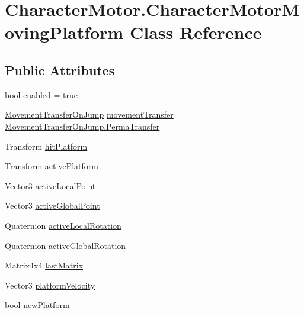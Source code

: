 \hypertarget{class_character_motor_1_1_character_motor_moving_platform}{}\section{Character\+Motor.\+Character\+Motor\+Moving\+Platform Class Reference}
\label{class_character_motor_1_1_character_motor_moving_platform}
\subsection*{Public Attributes}
\begin{DoxyCompactItemize}
\item 
bool \hyperlink{class_character_motor_1_1_character_motor_moving_platform_abd532a0a431c10e58955de10e0ed8918}{enabled} = true
\item 
\hyperlink{class_character_motor_ae8904b1ae7907502123f9376cf77a045}{Movement\+Transfer\+On\+Jump} \hyperlink{class_character_motor_1_1_character_motor_moving_platform_a39e0b3b19798b14d3a765c3e91fe630e}{movement\+Transfer} = \hyperlink{class_character_motor_ae8904b1ae7907502123f9376cf77a045a1caa5cdb42cd1fe12e5047b8aaa499b9}{Movement\+Transfer\+On\+Jump.\+Perma\+Transfer}
\item 
Transform \hyperlink{class_character_motor_1_1_character_motor_moving_platform_a62153b1440d4a6fbcd0f7064c7c6d2b6}{hit\+Platform}
\item 
Transform \hyperlink{class_character_motor_1_1_character_motor_moving_platform_a0d5b4f8856abe0c24a5ad741728996e5}{active\+Platform}
\item 
Vector3 \hyperlink{class_character_motor_1_1_character_motor_moving_platform_a108b1685e9124d3f800d7a26ec4abd85}{active\+Local\+Point}
\item 
Vector3 \hyperlink{class_character_motor_1_1_character_motor_moving_platform_a0d35fb1c70053aa840b393ced5ce17c0}{active\+Global\+Point}
\item 
Quaternion \hyperlink{class_character_motor_1_1_character_motor_moving_platform_a7b11fae44f773948228516789e3154de}{active\+Local\+Rotation}
\item 
Quaternion \hyperlink{class_character_motor_1_1_character_motor_moving_platform_a0ca18530189b62d35a1f2e2ed18fab7d}{active\+Global\+Rotation}
\item 
Matrix4x4 \hyperlink{class_character_motor_1_1_character_motor_moving_platform_a68b6bf95a317e047448b9e065689b523}{last\+Matrix}
\item 
Vector3 \hyperlink{class_character_motor_1_1_character_motor_moving_platform_ad1c109ba8ff3d6cf1e2da071aad621d7}{platform\+Velocity}
\item 
bool \hyperlink{class_character_motor_1_1_character_motor_moving_platform_af077caf93c489e2dac9802e01d7c90b2}{new\+Platform}
\end{DoxyCompactItemize}


